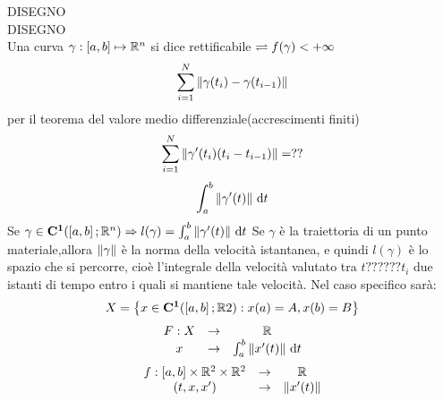 DISEGNO\\
DISEGNO\\
Una curva $\gamma : \left[a,b\right] \mapsto \mathbb{R}^n$ si dice rettificabile $\rightleftharpoons f(\gamma)<+\infty$
\observation
$$\sum\limits_{i=1}^{N}\left\|\gamma(t_i)-\gamma(t_{i-1})\right\| $$
per il teorema del valore medio differenziale(accrescimenti finiti)
$$\sum\limits_{i=1}^{N}\left\| \gamma'(t_i)(t_i-t_{i-1})\right\| =??$$
$$\int_{a}^{b}\left\| \gamma'(t)\right\| \,\mathrm{d}{t}$$
\proposition
Se $\gamma\in \mathbf{C^{1}}(\left[a,b\right]; \mathbb{R} ^n)\Rightarrow l(\gamma)=\int_a^b\left\|\gamma'(t)\right\|\,\mathrm{d}{t}$
\observation
Se $\gamma$ è la traiettoria di un punto materiale,allora $\left\|\gamma\right\|$ è la norma della velocità istantanea, e quindi $l(\gamma)$ è lo spazio che si percorre, cioè l'integrale della velocità valutato tra $t??????t_i$ due istanti di tempo entro i quali si mantiene tale velocità.
\observation
Nel caso specifico sarà:
$$ X=\left\{ x\in \mathbf{C^{1}}(\left[a,b\right]; \mathbb{R} 2): x(a)=A, x(b)=B \right\} $$
$$\begin{array}{ccc} 
F: X & \to & \mathbb{R} \\
x & \to & \int_{a}^b \left\|x'(t)\right\|\,\mathrm{d}{t}
\end{array}$$
$$\begin{array}{ccc} 
f: \left[a,b\right]\times \mathbb{R} ^2\times \mathbb{R} ^2 & \to & \mathbb{R} \\
(t,x, x') & \to &  \left\|x'(t)\right\|
\end{array}$$
